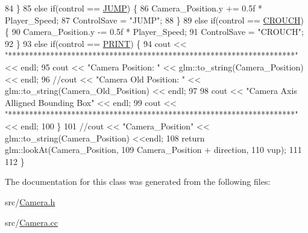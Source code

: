 \begin{DoxyCode}
84     \}
85         \textcolor{keywordflow}{else} \textcolor{keywordflow}{if}(control == \hyperlink{common_8h_a0da83e35f29c11f7f3c637234f2149f9a1f28d4392b1c1e7da2af2283632d81e1}{JUMP}) \{
86                 Camera\_Position.y += 0.5f * Player\_Speed;
87                 ControlSave = \textcolor{stringliteral}{"JUMP"};
88         \}
89         \textcolor{keywordflow}{else} \textcolor{keywordflow}{if}(control == \hyperlink{common_8h_a0da83e35f29c11f7f3c637234f2149f9a3cdd4783c5dbeae45bbcd15570a6b273}{CROUCH}) \{
90                 Camera\_Position.y -= 0.5f * Player\_Speed;
91                 ControlSave = \textcolor{stringliteral}{"CROUCH"};
92         \}
93         \textcolor{keywordflow}{else} \textcolor{keywordflow}{if}(control == \hyperlink{common_8h_a0da83e35f29c11f7f3c637234f2149f9ab107229d44d042caa8ab8df4c8acaa1f}{PRINT}) \{
94                 cout << \textcolor{stringliteral}{"********************************************************************"} << endl;
95                 cout << \textcolor{stringliteral}{"Camera Position: "} << glm::to\_string(Camera\_Position) << endl;
96                 \textcolor{comment}{//cout << "Camera Old Position: " << glm::to\_string(Camera\_Old\_Position) << endl;}
97                 
98                 cout << \textcolor{stringliteral}{"Camera Axis Alligned Bounding Box"} << endl;
99                 cout << \textcolor{stringliteral}{"********************************************************************"} << endl;
100         \}
101         \textcolor{comment}{//cout << "Camera\_Position" << glm::to\_string(Camera\_Position) <<endl;}
108 \textcolor{comment}{}        \textcolor{keywordflow}{return} glm::lookAt(Camera\_Position, 
109                            Camera\_Position + direction, 
110                            vup);
111    
112 \}
\end{DoxyCode}


The documentation for this class was generated from the following files\+:\begin{DoxyCompactItemize}
\item 
src/\hyperlink{_camera_8h}{Camera.\+h}\item 
src/\hyperlink{_camera_8cc}{Camera.\+cc}\end{DoxyCompactItemize}
